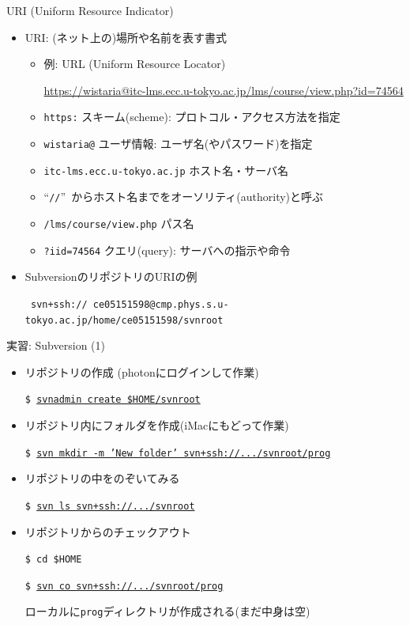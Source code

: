 \documentclass[dvipdfmx]{beamer}
\begin{document}
\begin{frame}[t,fragile]{URI (Uniform Resource Indicator)}
  \begin{itemize}
    \setlength{\itemsep}{1em}
  \item URI: (ネット上の)場所や名前を表す書式
    \begin{itemize}
    \item 例: URL (Uniform Resource Locator)

      {\footnotesize \url{https://wistaria@itc-lms.ecc.u-tokyo.ac.jp/lms/course/view.php?id=74564}}
    \item {\color{red}\tt https:} スキーム(scheme): プロトコル・アクセス方法を指定
    \item {\color{red}\tt wistaria@} ユーザ情報: ユーザ名(やパスワード)を指定
    \item {\color{red}\tt itc-lms.ecc.u-tokyo.ac.jp} ホスト名・サーバ名
    \item ``{\color{red}\tt //}''\ からホスト名までをオーソリティ(authority)と呼ぶ
    \item {\color{red}\tt /lms/course/view.php} パス名
    \item {\color{red}\tt ?iid=74564} クエリ(query): サーバへの指示や命令
  \end{itemize}
  \item SubversionのリポジトリのURIの例

    {\scriptsize \tt {\color{red} svn+ssh:}//{\color{blue} ce05151598@}cmp.phys.s.u-tokyo.ac.jp/home/ce05151598/svnroot}
  \end{itemize}
\end{frame}

\begin{frame}[t,fragile]{実習: Subversion (1)}
  \begin{itemize}
  \item リポジトリの作成 (photonにログインして作業)

    {\tt \$ \underline{svnadmin create \$HOME/svnroot}}
  \item リポジトリ内にフォルダを作成(iMacにもどって作業)

    {\tt \$~\underline{svn mkdir -m 'New folder' svn+ssh://.../svnroot/prog}}
  \item リポジトリの中をのぞいてみる

    {\tt \$ \underline{svn ls svn+ssh://.../svnroot}}

  \item リポジトリからのチェックアウト

    {\tt \$ cd \$HOME}
    
    {\tt \$ \underline{svn co svn+ssh://.../svnroot/prog}}

    ローカルに{\tt prog}ディレクトリが作成される(まだ中身は空)
  \end{itemize}
\end{frame}
\end{document}
